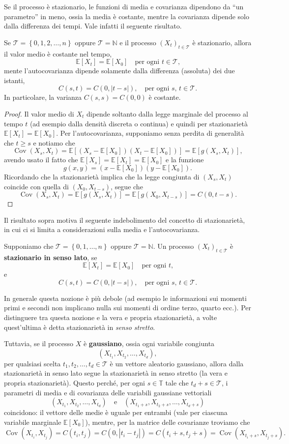 \documentclass[
  italian,
  letterpaper,
]{book}
\newcommand{\bra}[1]{\left( #1 \right)}
\newcommand{\sqa}[1]{\left[ #1 \right]}
\newcommand{\cur}[1]{\left\{ #1 \right\}}
\newcommand{\E}[1]{\mathbb{E}\sqa{#1}}
\newcommand{\Cov}[1]{\operatorname{Cov}\bra{#1}}
\theoremstyle{definition}
\theoremstyle{remark}
\begin{document}
Se il processo è stazionario, le funzioni di media e covarianza
dipendono da ``un parametro'' in meno, ossia la media è costante, mentre
la covarianza dipende solo dalla differenza dei tempi. Vale infatti il
seguente risultato.

Se \(\mathcal{T} = \cur{0,1,2,\ldots, n}\) oppure
\(\mathcal{T} =\mathbb{N}\) e il processo \((X_t)_{t \in \mathcal{T}}\)
è stazionario, allora il valor medio è costante nel tempo,
\[ \E{X_t} = \E{X_0} \quad \text{per ogni $t\in \mathcal{T}$,}\] mente
l'autocovarianza dipende solamente dalla differenza (assoluta) dei due
istanti,
\[ C(s,t) = C(0, |t-s|), \quad \text{per ogni $s$, $t \in \mathcal{T}$.}\]
In particolare, la varianza \(C(s,s) = C(0,0)\) è costante.

\begin{proof}
Il valor medio di \(X_t\) dipende soltanto dalla legge marginale del
processo al tempo \(t\) (ad esempio dalla densità discreta o continua) e
quindi per stazionarietà \(\E{X_t} = \E{X_0}\). Per l'autocovarianza,
supponiamo senza perdita di generalità che \(t \ge s\) e notiamo che
\[ \Cov{ X_s, X_t } = \E { (X_s - \E{X_0})(X_t -\E{X_0})} = \E{ g(X_s,X_t)},\]
avendo usato il fatto che \(\E{X_s}= \E{X_t} = \E{X_0}\) e la funzione
\[g (x, y) = (x- \E{X_0}) (y - \E{X_0}).\] Ricordando che la
stazionarietà implica che la legge congiunta di \((X_s, X_t)\) coincide
con quella di \((X_0, X_{t-s})\), segue che
\[ \Cov{X_s, X_t } = \E{ g(X_s, X_t)}  = \E{ g(X_0, X_{t-s})}= C(0, t-s).\]
\end{proof}

Il risultato sopra motiva il seguente indebolimento del concetto di
stazionarietà, in cui ci si limita a considerazioni sulla media e
l'autocovarianza.

Supponiamo che \(\mathcal{T}=\cur{0,1, \ldots, n}\) oppure
\(\mathcal{T} = \mathbb{N}\). Un processo \((X_t)_{t \in \mathcal{T}}\)
è \textbf{stazionario in senso lato}, se
\[ \E{X_t} = \E{X_0} \quad \text{per ogni $t$,}\] e
\[ C(s,t) = C(0, |t-s|), \quad \text{per ogni $s$, $t \in \mathcal{T}$.}\]

In generale questa nozione è più debole (ad esempio le informazioni sui
momenti primi e secondi non implicano nulla sui momenti di ordine terzo,
quarto ecc.). Per distinguere tra questa nozione e la vera e propria
stazionarietà, a volte quest'ultima è detta stazionarietà in \emph{senso
stretto}.

Tuttavia, se il processo \(X\) è \textbf{gaussiano}, ossia ogni
variabile congiunta \[(X_{t_1}, X_{t_2}, \ldots, X_{t_d}),\] per
qualsiasi scelta \(t_1, t_2, \ldots, t_d \in \mathcal{T}\) è un vettore
aleatorio gaussiano, allora dalla stazionarietà in senso lato segue la
stazionarietà in senso stretto (la vera e propria stazionarietà). Questo
perché, per ogni \(s \in \mathbb{T}\) tale che
\(t_d+s \in \mathcal{T}\), i parametri di media e di covarianza delle
variabili gaussiane vettoriali
\[(X_{t_1}, X_{t_2}, \ldots, X_{t_d}) \quad \text{e} \quad (X_{t_1+s}, X_{t_2+s}, \ldots, X_{t_d+s})\]
coincidono: il vettore delle medie è uguale per entrambi (vale per
ciascuna variabile marginale \(\E{X_0}\)), mentre, per la matrice delle
covarianze troviamo che
\[ \Cov{X_{t_i}, X_{t_j} } = C(t_i, t_j) = C(0, |t_i-t_j|) = C(t_i+s, t_j+s) = \Cov{X_{t_i+s}, X_{t_j+s} }.\]
\end{document}
